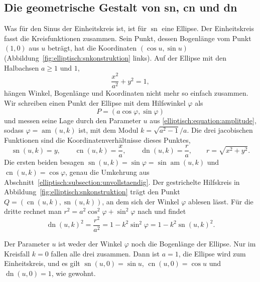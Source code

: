 \subsection{Die geometrische Gestalt von sn, cn und dn
\label{elliptisch:subsection:geometrie}}
Was für den Sinus der Einheitskreis ist, ist für
$\operatorname{sn}$ eine Ellipse.
Der Einheitskreis fasst die Kreisfunktionen zusammen.
Sein Punkt, dessen Bogenlänge vom Punkt $(1,0)$ aus $u$ beträgt,
hat die Koordinaten $(\cos u, \sin u)$
(Abbildung~\ref{fig:elliptisch:snkonstruktion} links).
Auf der Ellipse mit den Halbachsen $a \ge 1$ und $1$,
\begin{equation}
\frac{x^2}{a^2} + y^2 = 1,
\label{elliptisch:equation:einheitsellipse}
\end{equation}
hängen Winkel, Bogenlänge und Koordinaten nicht mehr so einfach
zusammen.
Wir schreiben einen Punkt der Ellipse mit dem Hilfswinkel
$\varphi$ als
\begin{equation}
P
=
(a\cos\varphi, \sin\varphi)
\label{elliptisch:equation:ellipsenpunkt}
\end{equation}
und messen seine Lage durch den Parameter $u$ aus
\eqref{elliptisch:equation:amplitude}, sodass
$\varphi = \operatorname{am}(u,k)$ ist, mit dem Modul
$k = \sqrt{a^2-1}/a$.
Die drei jacobischen Funktionen sind die
Koordinatenverhältnisse dieses Punktes,
\begin{equation}
\operatorname{sn}(u,k) = y,
\qquad
\operatorname{cn}(u,k) = \frac{x}{a},
\qquad
\operatorname{dn}(u,k) = \frac{r}{a},
\qquad
r = \sqrt{x^2+y^2}.
\label{elliptisch:equation:geometrischedefinition}
\end{equation}
Die ersten beiden besagen
$\operatorname{sn}(u,k) = \sin\varphi = \sin\operatorname{am}(u,k)$
und $\operatorname{cn}(u,k) = \cos\varphi$, genau die Umkehrung
aus Abschnitt~\ref{elliptisch:subsection:unvollstaendig}.
Der gestrichelte Hilfskreis in
Abbildung~\ref{fig:elliptisch:snkonstruktion} trägt den Punkt
$Q = (\operatorname{cn}(u,k), \operatorname{sn}(u,k))$, an dem
sich der Winkel $\varphi$ ablesen lässt.
Für die dritte rechnet man $r^2 = a^2\cos^2\varphi + \sin^2\varphi$
nach und findet
\begin{equation}
\operatorname{dn}(u,k)^2
=
\frac{r^2}{a^2}
=
1 - k^2\sin^2\varphi
=
1 - k^2\operatorname{sn}(u,k)^2.
\label{elliptisch:equation:dngeometrie}
\end{equation}


Der Parameter $u$ ist weder der Winkel $\varphi$ noch die
Bogenlänge der Ellipse.
Nur im Kreisfall $k = 0$ fallen alle drei zusammen.
Dann ist $a = 1$, die Ellipse wird zum Einheitskreis, und es gilt
$\operatorname{sn}(u,0) = \sin u$, $\operatorname{cn}(u,0) = \cos u$
und $\operatorname{dn}(u,0) = 1$, wie gewohnt.

